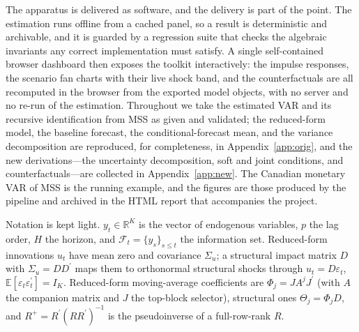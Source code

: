 \documentclass[11pt]{article}
\newcommand{\E}{\mathbb{E}}
\newcommand{\Fset}{\mathcal{F}}
\newcommand{\R}{\mathbb{R}}
\newcommand{\tp}{^{\prime}}
\newcommand{\eps}{\varepsilon}
\newcommand{\pinv}[1]{#1^{+}}
\theoremstyle{remark}
\begin{document}
The apparatus is delivered as software, and the delivery is part of the point.
The estimation runs offline from a cached panel, so a result is deterministic and
archivable, and it is guarded by a regression suite that checks the algebraic
invariants any correct implementation must satisfy. A single self-contained
browser dashboard then exposes the toolkit interactively: the impulse responses,
the scenario fan charts with their live shock band, and the counterfactuals are
all recomputed in the browser from the exported model objects, with no server and
no re-run of the estimation. Throughout we take the estimated VAR and its
recursive identification from MSS as given and validated; the reduced-form model,
the baseline forecast, the conditional-forecast mean, and the variance
decomposition are reproduced, for completeness, in Appendix~\ref{app:orig}, and
the new derivations---the uncertainty decomposition, soft and joint conditions,
and counterfactuals---are collected in Appendix~\ref{app:new}. The Canadian
monetary VAR of MSS is the running example, and the figures are those produced by
the pipeline and archived in the HTML report that accompanies the project.

Notation is kept light. $y_t\in\R^{K}$ is the vector of endogenous variables, $p$
the lag order, $H$ the horizon, and $\Fset_t=\{y_s\}_{s\le t}$ the information set.
Reduced-form innovations $u_t$ have mean zero and covariance $\Sigma_u$; a
structural impact matrix $D$ with $\Sigma_u=DD\tp$ maps them to orthonormal
structural shocks through $u_t=D\eps_t$, $\E[\eps_t\eps_t\tp]=I_K$. Reduced-form
moving-average coefficients are $\Phi_j=JA^jJ\tp$ (with $A$ the companion matrix
and $J$ the top-block selector), structural ones $\Theta_j=\Phi_jD$, and
$\pinv{R}=R\tp(RR\tp)^{-1}$ is the pseudoinverse of a full-row-rank $R$.

\end{document}
